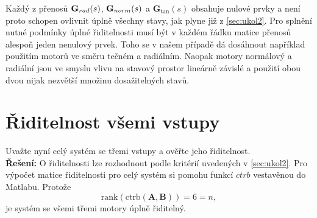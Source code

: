 \documentclass[twoside]{article}
\begin{document}
Každý z přenosů $\mathbf{G}_{rad}(s)$, $\mathbf{G}_{norm}(s)$ a $\mathbf{G}_\tan(s)$ obsahuje nulové prvky a není proto schopen ovlivnit 
úplně všechny stavy, jak plyne již z \ref{sec:ukol2}. Pro splnění nutné podmínky úplné řiditelnosti musí být v 
každém řádku matice přenosů alespoň jeden nenulový prvek. Toho se v našem případě dá dosáhnout
například použitím motorů ve směru tečném a radiálním. Naopak motory normálový a radiální jsou ve smyslu vlivu na
stavový prostor lineárně závislé a použití obou dvou nijak nezvětší množinu dosažitelných stavů.

\section{Řiditelnost všemi vstupy}
\label{sec:ukol4}
Uvažte nyní celý systém se třemi vstupy a ověřte jeho řiditelnost. \\
\textbf{Řešení:}
O řiditelnosti lze rozhodnout podle kritérií uvedených v \ref{sec:ukol2}.
Pro výpočet  matice řiditelnosti pro celý systém si pomohu funkcí $ctrb$ vestavěnou do Matlabu. Protože
\begin{equation*}
	\text{rank}(\text{ctrb}(\mathbf{A}, \mathbf{B})) = 6 = n,
\end{equation*}
je systém se všemi třemi motory úplně řiditelný.
\end{document}
